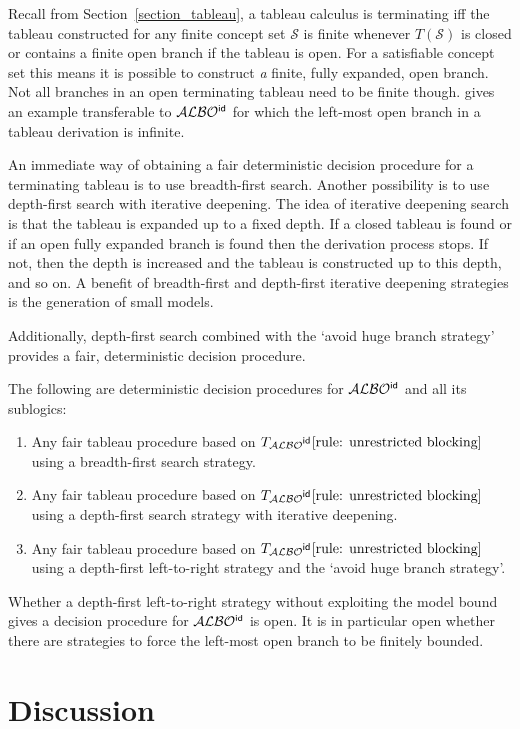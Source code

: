 \documentclass[leqno
,pdflatex
,prodmode
,acmtocl
]{acmsmall}
\newcommand{\mathcmd}[1]{\ensuremath{#1}\xspace}
\newcommand{\dlfont}{\mathcal}
\newcommand{\dl}[1]{\mathcmd{\dlfont{#1}}}
\newcommand{\idRole}{\mathcmd{\textsf{\upshape\mdseries id}}}
\newcommand{\ALBOid}{\dl{ALBO\smash[t]{\mbox{${}^{\idRole}$}}}}
\newcommand{\TALBOidub}{\mathcmd{T_\ALBOid\eqref{rule: unrestricted blocking}}}
\begin{document}
Recall from Section~\ref{section_tableau}, a tableau calculus is terminating iff the tableau
constructed for any finite concept set $\mathcal{S}$ is finite whenever $T(\mathcal{S})$ is closed or
contains a finite open
branch if the tableau is open.
For a satisfiable concept set this means it is possible to construct
\emph{a} finite, fully expanded, open branch.
Not all branches in an open terminating tableau need to be finite though.
 gives an example transferable to \ALBOid
for which the left-most open branch in a tableau derivation is infinite.

An immediate way of obtaining a fair deterministic decision
procedure for a terminating tableau is to use breadth-first search.
Another possibility is to use depth-first search with iterative
deepening.
The idea of iterative deepening search is that the tableau is
expanded up to a fixed depth. 
If a closed tableau is found or if an open fully expanded branch is
found then the derivation process stops.
If not, then the depth is increased and the tableau is constructed up to
this depth, and so on.
A benefit of breadth-first and depth-first iterative deepening
strategies is the generation of small models.

Additionally, depth-first search combined with the `avoid huge branch
strategy' provides a fair, deterministic decision procedure.

\begin{theorem}
The following are deterministic decision procedures for
\ALBOid and all its sublogics:
\begin{enumerate}
 \item 
Any fair tableau procedure based on \TALBOidub using a breadth-first 
search strategy.
\item 
Any fair tableau procedure based on \TALBOidub using a depth-first search strategy
with iterative deepening.
 \item 
Any fair tableau procedure based on \TALBOidub using a depth-first
left-to-right strategy and the `avoid huge branch strategy'.\end{enumerate}
\end{theorem}

Whether a depth-first left-to-right strategy without exploiting the model bound
gives a decision procedure for \ALBOid  is open.
It is in particular open whether there are strategies to force the left-most
open branch to be finitely bounded.

\section{Discussion}
\label{section_discussion}
\end{document}
